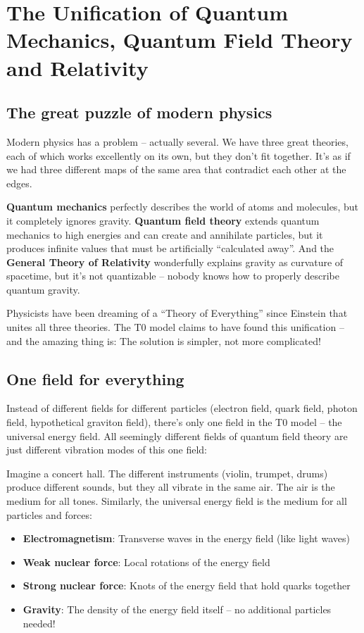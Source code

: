 	\section{The Unification of Quantum Mechanics, Quantum Field Theory and Relativity}
	
	\subsection{The great puzzle of modern physics}
	
	Modern physics has a problem -- actually several. We have three great theories, each of which works excellently on its own, but they don't fit together. It's as if we had three different maps of the same area that contradict each other at the edges.
	
	\textbf{Quantum mechanics} perfectly describes the world of atoms and molecules, but it completely ignores gravity. \textbf{Quantum field theory} extends quantum mechanics to high energies and can create and annihilate particles, but it produces infinite values that must be artificially ``calculated away''. And the \textbf{General Theory of Relativity} wonderfully explains gravity as curvature of spacetime, but it's not quantizable -- nobody knows how to properly describe quantum gravity.
	
	Physicists have been dreaming of a ``Theory of Everything'' since Einstein that unites all three theories. The T0 model claims to have found this unification -- and the amazing thing is: The solution is simpler, not more complicated!
	
	\subsection{One field for everything}
	
	Instead of different fields for different particles (electron field, quark field, photon field, hypothetical graviton field), there's only one field in the T0 model -- the universal energy field. All seemingly different fields of quantum field theory are just different vibration modes of this one field:
	
	\begin{important}
		Imagine a concert hall. The different instruments (violin, trumpet, drums) produce different sounds, but they all vibrate in the same air. The air is the medium for all tones. Similarly, the universal energy field is the medium for all particles and forces:
		\begin{itemize}
			\item \textbf{Electromagnetism}: Transverse waves in the energy field (like light waves)
			\item \textbf{Weak nuclear force}: Local rotations of the energy field
			\item \textbf{Strong nuclear force}: Knots of the energy field that hold quarks together
			\item \textbf{Gravity}: The density of the energy field itself -- no additional particles needed!
		\end{itemize}
	\end{important}
	
